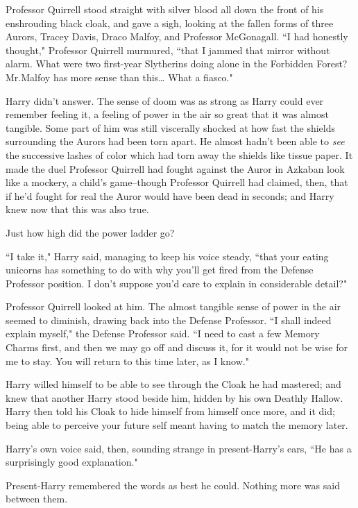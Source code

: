 Professor Quirrell stood straight with silver blood all down the front of his enshrouding black cloak, and gave a sigh, looking at the fallen forms of three Aurors, Tracey Davis, Draco Malfoy, and Professor McGonagall. ``I had honestly thought," Professor Quirrell murmured, ``that I jammed that mirror without alarm. What were two first-year Slytherins doing alone in the Forbidden Forest? Mr.\?Malfoy has more sense than this{\ldots} What a fiasco."

Harry didn't answer. The sense of doom was as strong as Harry could ever remember feeling it, a feeling of power in the air so great that it was almost tangible. Some part of him was still viscerally shocked at how fast the shields surrounding the Aurors had been torn apart. He almost hadn't been able to \emph{see} the successive lashes of color which had torn away the shields like tissue paper. It made the duel Professor Quirrell had fought against the Auror in Azkaban look like a mockery, a child's game\---though Professor Quirrell had claimed, then, that if he'd fought for real the Auror would have been dead in seconds; and Harry knew now that this was also true.

Just how high did the power ladder go?

``I take it," Harry said, managing to keep his voice steady, ``that your eating unicorns has something to do with why you'll get fired from the Defense Professor position. I don't suppose you'd care to explain in considerable detail?"

Professor Quirrell looked at him. The almost tangible sense of power in the air seemed to diminish, drawing back into the Defense Professor. ``I shall indeed explain myself," the Defense Professor said. ``I need to cast a few Memory Charms first, and then we may go off and discuss it, for it would not be wise for me to stay. You will return to this time later, as I know."

Harry willed himself to be able to see through the Cloak he had mastered; and knew that another Harry stood beside him, hidden by his own Deathly Hallow. Harry then told his Cloak to hide himself from himself once more, and it did; being able to perceive your future self meant having to match the memory later.

Harry's own voice said, then, sounding strange in present-Harry's ears, ``He has a surprisingly good explanation."

Present-Harry remembered the words as best he could. Nothing more was said between them.

